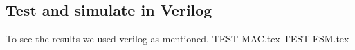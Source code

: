 \subsection{Test and simulate in Verilog}
To see the results we used verilog as mentioned.
{TEST MAC.tex}
{TEST FSM.tex}

